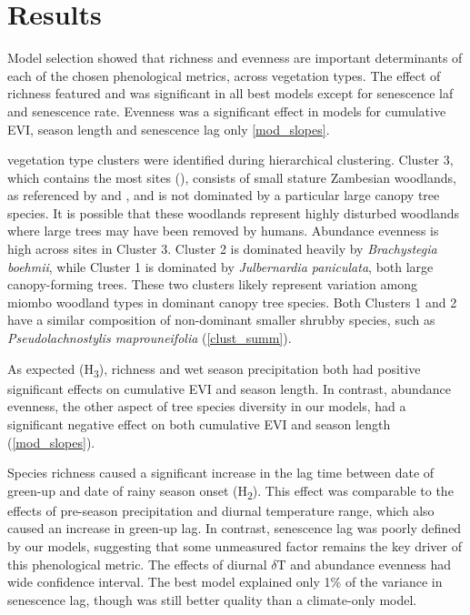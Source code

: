 \documentclass[11pt,a4paper]{article}
\begin{document}
\section{Results}

Model selection showed that richness and evenness are important determinants of each of the chosen phenological metrics, across vegetation types. The effect of richness featured and was significant in all best models except for senescence laf and senescence rate. Evenness was a significant effect in models for cumulative EVI, season length and senescence lag only \autoref{mod_slopes}.

\nCluster{} vegetation type clusters were identified during hierarchical clustering. Cluster 3, which contains the most sites (\nClusterC{}), consists of small stature Zambesian woodlands, as referenced by \citet{Dinerstein2017} and \citet{Chidumayo2001}, and is not dominated by a particular large canopy tree species. It is possible that these woodlands represent highly disturbed woodlands where large trees may have been removed by humans. Abundance evenness is high across sites in Cluster 3. Cluster 2 is dominated heavily by \textit{Brachystegia boehmii}, while Cluster 1 is dominated by \textit{Julbernardia paniculata}, both large canopy-forming trees. These two clusters likely represent variation among miombo woodland types in dominant canopy tree species. Both Clusters 1 and 2 have a similar composition of non-dominant smaller shrubby species, such as \textit{Pseudolachnostylis maprouneifolia} (\autoref{clust_summ}).

As expected (H\textsubscript{3}), richness and wet season precipitation both had positive significant effects on cumulative EVI and season length. In contrast, abundance evenness, the other aspect of tree species diversity in our models, had a significant negative effect on both cumulative EVI and season length (\autoref{mod_slopes}).

Species richness caused a significant increase in the lag time between date of green-up and date of rainy season onset (H\textsubscript{2}). This effect was comparable to the effects of pre-season precipitation and diurnal temperature range, which also caused an increase in green-up lag. In contrast, senescence lag was poorly defined by our models, suggesting that some unmeasured factor remains the key driver of this phenological metric. The effects of diurnal $\delta$T and abundance evenness had wide confidence interval. The best model explained only 1\% of the variance in senescence lag, though was still better quality than a climate-only model.
\end{document}
